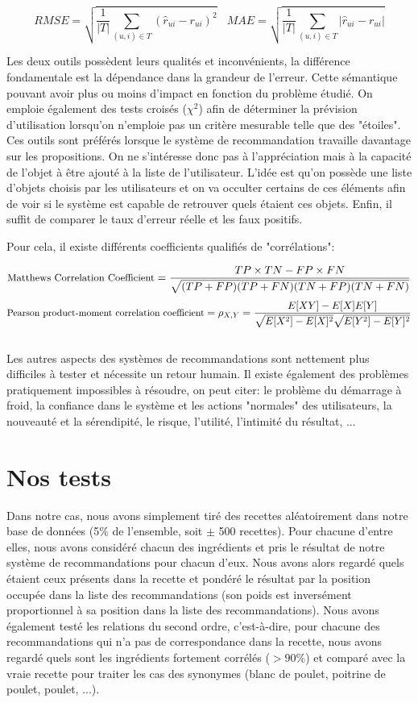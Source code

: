 $$ RMSE = \sqrt{\frac{1}{|T|}\sum\limits_{(u, i) \in T} (\hat{r}_{ui} - r_{ui})^2} ~~~~ MAE = \sqrt{\frac{1}{|T|}\sum\limits_{(u, i) \in T} |\hat{r}_{ui} - r_{ui}|}$$

Les deux outils possèdent leurs qualités et inconvénients, la différence fondamentale est la dépendance dans la grandeur de l'erreur. Cette sémantique pouvant avoir plus ou moins d'impact en fonction du problème étudié.
On emploie également des tests croisés ($\chi^{2}$) afin de déterminer la prévision d'utilisation lorsqu'on n'emploie pas un critère mesurable telle que des "étoiles". Ces outils sont préférés lorsque le système de recommandation travaille davantage sur les propositions. On ne s'intéresse donc pas à l'appréciation mais à la capacité de l'objet à être ajouté à la liste de l'utilisateur. L'idée est qu'on possède une liste d'objets choisis par les utilisateurs et on va occulter certains de ces éléments afin de voir si le système est capable de retrouver quels étaient ces objets. Enfin, il suffit de comparer le taux d'erreur réelle et les faux positifs.

Pour cela, il existe différents coefficients qualifiés de "corrélations":

$$ \small{ \textnormal{Matthews Correlation Coefficient} = \frac{TP \times TN - FP \times FN}{\sqrt{(TP + FP)(TP + FN)(TN + FP)(TN + FN)}} } $$
$$ \small{ \textnormal{Pearson product-moment correlation coefficient} = \rho_{X, Y} = \frac{E[XY] - E[X] E[Y]}{\sqrt{E[X^{2}] - E[X]^{2}} \sqrt{E[Y^{2}] - E[Y]^{2}}} } $$ \\


Les autres aspects des systèmes de recommandations sont nettement plus difficiles à tester et nécessite un retour humain. Il existe également des problèmes pratiquement impossibles à résoudre, on peut citer: le problème du démarrage à froid, la confiance dans le système et les actions "normales" des utilisateurs, la nouveauté et la sérendipité, le risque, l'utilité, l'intimité du résultat, ...

\section{Nos tests}

Dans notre cas, nous avons simplement tiré des recettes aléatoirement dans notre base de données (5\% de l'ensemble, soit $\pm$ 500 recettes). Pour chacune d'entre elles, nous avons considéré chacun des ingrédients et pris le résultat de notre système de recommandations pour chacun d'eux. Nous avons alors regardé quels étaient ceux présents dans la recette et pondéré le résultat par la position occupée dans la liste des recommandations (son poids est inversément proportionnel à sa position dans la liste des recommandations).
Nous avons également testé les relations du second ordre, c'est-à-dire, pour chacune des recommandations qui n'a pas de correspondance dans la recette, nous avons regardé quels sont les ingrédients fortement corrélés ($> 90\%$) et comparé avec la vraie recette pour traiter les cas des synonymes (blanc de poulet, poitrine de poulet, poulet, ...).

